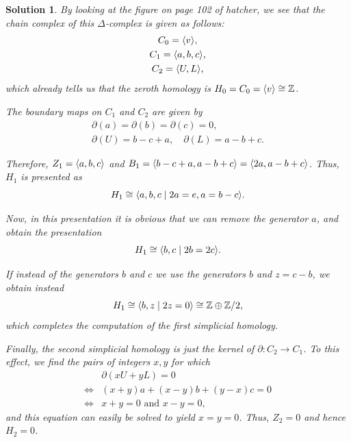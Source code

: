 \documentclass{article}
\theoremstyle{plain}
\theoremstyle{nonumberplain}
\newtheorem{sol}{Solution}
\newcommand{\Z}{\mathbb{Z}}
\DeclarePairedDelimiter{\braket}{\langle}{\rangle}
\begin{document}
\begin{sol}
By looking at the figure on page 102 of hatcher, we see that the chain complex of this $\Delta$-complex is given as follows:
\begin{gather}
C_0 = \braket{v},\\
C_1 = \braket{a,b,c},\\
C_2 = \braket{U,L},
\end{gather}
which already tells us that the zeroth homology is $H_0 = C_0 = \braket{v} \cong \Z$.

The boundary maps on $C_1$ and $C_2$ are given by
\begin{gather}
\partial(a) = \partial(b) = \partial(c) = 0,\\
\partial(U) = b - c + a, \quad \partial(L) = a - b + c.
\end{gather}

Therefore, $Z_1 = \braket{a,b,c}$ and $B_1 = \braket{b-c+a, a-b+c} = \braket{2a,a-b+c}$. Thus, $H_1$ is presented as
\begin{equation}
H_1 \cong \braket{a,b,c \mid 2a = e, a = b-c}.
\end{equation}

Now, in this presentation it is obvious that we can remove the generator $a$, and obtain the presentation
\begin{equation}
H_1 \cong \braket{b,c \mid 2b = 2c}.
\end{equation}

If instead of the generators $b$ and $c$ we use the generators $b$ and $z = c-b$, we obtain instead
\begin{equation}
H_1 \cong \braket{b,z \mid 2z = 0} \cong \Z \oplus \Z/2,
\end{equation}
which completes the computation of the first simplicial homology.

Finally, the second simplicial homology is just the kernel of $\partial \colon C_2 \to C_1$. To this effect, we find the pairs of integers $x,y$ for which
\begin{equation}
\begin{aligned}
& \partial(xU + yL) = 0\\
\iff & (x+y) a + (x - y)b + (y-x) c = 0\\
\iff & x+y = 0 \text{ and } x-y = 0,
\end{aligned}
\end{equation}
and this equation can easily be solved to yield $x = y = 0$. Thus, $Z_2 = 0$ and hence $H_2 = 0$.
\end{sol}
\end{document}

